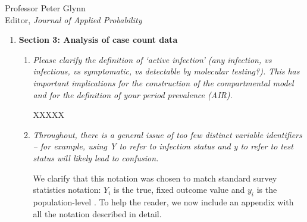 \documentclass[11pt]{letter} %
\begin{document}
\begin{letter}{Professor
	Peter Glynn\\
	Editor, {\em Journal of Applied Probability}}
\begin{enumerate}
\begin{enumerate}
	\vspace{5mm}
	\item {\it For the Facebook / CMU survey sample, please present the age breakdown of sampled individuals. It is well-known that the age-distribution of Facebook users differs from the general population, so this is unlikely to be a representative sample of the Indiana population. Other demographic information on this sample would be valuable too. (Why is it not included in Table 1?)}
	\vspace{5mm}

	The difference in age breakdown of sampled individuals in the Facebook / CMU survey, now referred to as Delphi's COVID-19 Trends and Impact Survey (CTIS), from the general population is acknowledged in Section 5.  Table 1 now presents estimates of all demographic and covariate information using Delphi CTIS's weighting procedure.  These weights are used in computing probabilities of selection as shown in Equation (4.2) in Section 4.1.1. Estimates for 'Fever' and 'Household + Case' only use data collected between April 25th and 29th to match the timing of the random survey.  Note that individual-level racial demographics were not provided by CTIS due to data privacy concerns and there was no corresponding question on percent of tests from individuals with a prior positive test.

	\vspace{5mm}
\end{enumerate}
\item {\bf Section 3: Analysis of case count data}
\begin{enumerate}
	\item {\it Please clarify the definition of ‘active infection’ (any infection, vs infectious, vs symptomatic, vs detectable by molecular testing?). This has important implications for the construction of the compartmental model and for the definition of your period prevalence (AIR).}
	\vspace{5mm}

	XXXXX
	\vspace{5mm}
	\item {\it Throughout, there is a general issue of too few distinct variable identifiers – for example, using Y to refer to infection status and y to refer to test status will likely lead to confusion.}
	\vspace{5mm}

	We clarify that this notation was chosen to match standard survey statistics notation: $Y_i$ is the true, fixed outcome value and $y_i$ is the  population-level .  To help the reader, we now include an appendix with all the notation described in detail.
	\vspace{5mm}


\end{enumerate}
\end{enumerate}
\end{letter}
\end{document}

